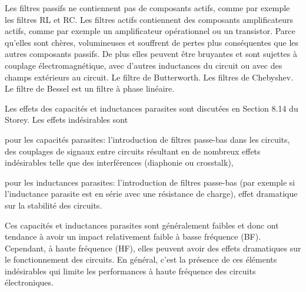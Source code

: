 \documentclass{../template/tp}
\begin{document}
{
Les filtres passifs ne contiennent pas de composants actifs, comme par exemple les filtres RL et RC. Les filtres actifs contiennent des composants amplificateurs actifs, comme par exemple un amplificateur opérationnel ou un transistor.
}
{
Parce qu'elles sont chères, volumineuses et souffrent de pertes plus conséquentes que les autres composants passifs. De plus elles peuvent être bruyantes et sont sujettes à couplage électromagnétique, avec d'autres inductances du circuit ou avec des champs extérieurs au circuit.
}
{
Le filtre de Butterworth. %
}
{
Les filtres de Chebyshev.
}
{
Le filtre de Bessel est un filtre à phase linéaire.
}
{
Les effets des capacités et inductances parasites sont discutées en Section 8.14 du Storey.
Les effets indésirables sont
\begin{inparaenum}[(a)]
\item pour les capacités parasites: l'introduction de filtres passe-bas dans les circuits, des couplages de signaux entre circuits résultant en de nombreux effets indésirables telle que des interférences (diaphonie ou crosstalk),
\item pour les inductances parasites: l'introduction de filtres passe-bas (par exemple si l'inductance parasite est en série avec une résistance de charge), effet dramatique sur la stabilité des circuits.
\end{inparaenum}
Ces capacités et inductances parasites sont généralement faibles et donc ont tendance à avoir un impact relativement faible à basse fréquence (BF). Cependant, à haute fréquence (HF), elles peuvent avoir des effets dramatiques sur le fonctionnement des circuits. En général, c'est la présence de ces éléments indésirables qui limite les performances à haute fréquence des circuits électroniques.
}
\end{document}
